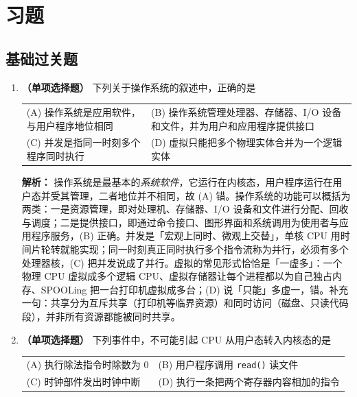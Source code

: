 \section{习题}

\subsection{基础过关题}

\begin{enumerate}

\item \textbf{（单项选择题）} 下列关于操作系统的叙述中，正确的是
\begin{center}
\begin{tabularx}{\linewidth}{@{}XX@{}}
(A) 操作系统是应用软件，与用户程序地位相同 & (B) 操作系统管理处理器、存储器、I/O 设备和文件，并为用户和应用程序提供接口 \\[4pt]
(C) 并发是指同一时刻多个程序同时执行 & (D) 虚拟只能把多个物理实体合并为一个逻辑实体
\end{tabularx}
\end{center}

\ifshowsolutions\par\noindent\textbf{解析：} 操作系统是最基本的\emph{系统软件}，它运行在内核态，用户程序运行在用户态并受其管理，二者地位并不相同，故 (A) 错。操作系统的功能可以概括为两类：一是资源管理，即对处理机、存储器、I/O 设备和文件进行分配、回收与调度；二是提供接口，即通过命令接口、图形界面和系统调用为使用者与应用程序服务，(B) 正确。并发是「宏观上同时、微观上交替」，单核 CPU 用时间片轮转就能实现；同一时刻真正同时执行多个指令流称为并行，必须有多个处理器核，(C) 把并发说成了并行。虚拟的常见形式恰恰是「一虚多」：一个物理 CPU 虚拟成多个逻辑 CPU、虚拟存储器让每个进程都以为自己独占内存、SPOOLing 把一台打印机虚拟成多台；(D) 说「只能」多虚一，错。补充一句：共享分为互斥共享（打印机等临界资源）和同时访问（磁盘、只读代码段），并非所有资源都能被同时共享。\else \answerarea \fi

\vspace{8pt}

\item \textbf{（单项选择题）} 下列事件中，不可能引起 CPU 从用户态转入内核态的是
\begin{center}
\begin{tabular}{ll}
(A) 执行除法指令时除数为 $0$ & (B) 用户程序调用 \texttt{read()} 读文件 \\[4pt]
(C) 时钟部件发出时钟中断 & (D) 执行一条把两个寄存器内容相加的指令
\end{tabular}
\end{center}


\end{enumerate}
